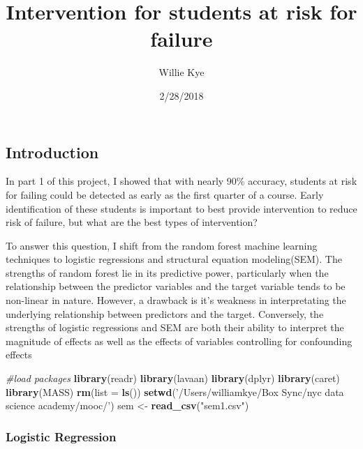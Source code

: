 \documentclass[]{article}
\title{Intervention for students at risk for failure}
\author{Willie Kye}
\date{2/28/2018}
\newenvironment{Shaded}{\begin{snugshade}}{\end{snugshade}}
\newcommand{\KeywordTok}[1]{\textcolor[rgb]{0.13,0.29,0.53}{\textbf{#1}}}
\newcommand{\DataTypeTok}[1]{\textcolor[rgb]{0.13,0.29,0.53}{#1}}
\newcommand{\StringTok}[1]{\textcolor[rgb]{0.31,0.60,0.02}{#1}}
\newcommand{\CommentTok}[1]{\textcolor[rgb]{0.56,0.35,0.01}{\textit{#1}}}
\newcommand{\NormalTok}[1]{#1}
\begin{document}
\maketitle

\subsection{Introduction}\label{introduction}

In part 1 of this project, I showed that with nearly 90\% accuracy,
students at risk for failing could be detected as early as the first
quarter of a course. Early identification of these students is important
to best provide intervention to reduce risk of failure, but what are the
best types of intervention?

To answer this question, I shift from the random forest machine learning
techniques to logistic regressions and structural equation
modeling(SEM). The strengths of random forest lie in its predictive
power, particularly when the relationship between the predictor
variables and the target variable tends to be non-linear in nature.
However, a drawback is it's weakness in interpretating the underlying
relationship between predictors and the target. Conversely, the
strengths of logistic regressions and SEM are both their ability to
interpret the magnitude of effects as well as the effects of variables
controlling for confounding effects

\begin{Shaded}
\begin{Highlighting}[]
\CommentTok{#load packages}
\KeywordTok{library}\NormalTok{(readr)}
\KeywordTok{library}\NormalTok{(lavaan)}
\KeywordTok{library}\NormalTok{(dplyr)}
\KeywordTok{library}\NormalTok{(caret)}
\KeywordTok{library}\NormalTok{(MASS)}
\KeywordTok{rm}\NormalTok{(}\DataTypeTok{list =} \KeywordTok{ls}\NormalTok{())}
\KeywordTok{setwd}\NormalTok{(}\StringTok{'/Users/williamkye/Box Sync/nyc data science academy/mooc/'}\NormalTok{)}
\NormalTok{sem <-}\StringTok{ }\KeywordTok{read_csv}\NormalTok{(}\StringTok{"sem1.csv"}\NormalTok{)}
\end{Highlighting}
\end{Shaded}

\subsubsection{Logistic Regression}\label{logistic-regression}
\end{document}
